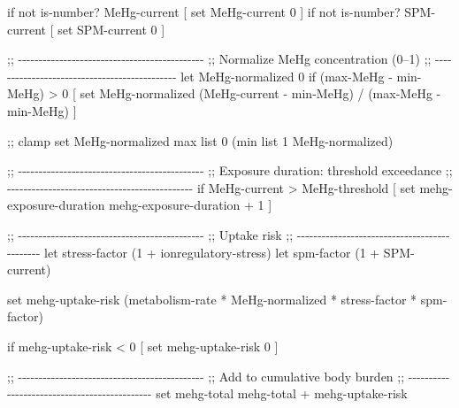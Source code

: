 \documentclass[
]{book}
\newenvironment{Shaded}{\begin{snugshade}}{\end{snugshade}}
\newcommand{\NormalTok}[1]{#1}
\begin{document}
\begin{Shaded}
\begin{Highlighting}[]
\NormalTok{  if not is{-}number? MeHg{-}current [ set MeHg{-}current 0 ]}
\NormalTok{  if not is{-}number? SPM{-}current  [ set SPM{-}current 0 ]}

\NormalTok{  ;; {-}{-}{-}{-}{-}{-}{-}{-}{-}{-}{-}{-}{-}{-}{-}{-}{-}{-}{-}{-}{-}{-}{-}{-}{-}{-}{-}{-}{-}{-}{-}{-}{-}{-}{-}{-}{-}{-}{-}{-}{-}{-}{-}{-}{-}}
\NormalTok{  ;; Normalize MeHg concentration (0–1)}
\NormalTok{  ;; {-}{-}{-}{-}{-}{-}{-}{-}{-}{-}{-}{-}{-}{-}{-}{-}{-}{-}{-}{-}{-}{-}{-}{-}{-}{-}{-}{-}{-}{-}{-}{-}{-}{-}{-}{-}{-}{-}{-}{-}{-}{-}{-}{-}{-}}
\NormalTok{  let MeHg{-}normalized 0}
\NormalTok{  if (max{-}MeHg {-} min{-}MeHg) \textgreater{} 0 [}
\NormalTok{    set MeHg{-}normalized (MeHg{-}current {-} min{-}MeHg) / (max{-}MeHg {-} min{-}MeHg)}
\NormalTok{  ]}
  
\NormalTok{  ;; clamp}
\NormalTok{  set MeHg{-}normalized max list 0 (min list 1 MeHg{-}normalized)}
  
\NormalTok{  ;; {-}{-}{-}{-}{-}{-}{-}{-}{-}{-}{-}{-}{-}{-}{-}{-}{-}{-}{-}{-}{-}{-}{-}{-}{-}{-}{-}{-}{-}{-}{-}{-}{-}{-}{-}{-}{-}{-}{-}{-}{-}{-}{-}{-}{-}}
\NormalTok{  ;; Exposure duration: threshold exceedance}
\NormalTok{  ;; {-}{-}{-}{-}{-}{-}{-}{-}{-}{-}{-}{-}{-}{-}{-}{-}{-}{-}{-}{-}{-}{-}{-}{-}{-}{-}{-}{-}{-}{-}{-}{-}{-}{-}{-}{-}{-}{-}{-}{-}{-}{-}{-}{-}{-}}
\NormalTok{  if MeHg{-}current \textgreater{} MeHg{-}threshold [}
\NormalTok{    set mehg{-}exposure{-}duration mehg{-}exposure{-}duration + 1}
\NormalTok{  ]}
  
\NormalTok{  ;; {-}{-}{-}{-}{-}{-}{-}{-}{-}{-}{-}{-}{-}{-}{-}{-}{-}{-}{-}{-}{-}{-}{-}{-}{-}{-}{-}{-}{-}{-}{-}{-}{-}{-}{-}{-}{-}{-}{-}{-}{-}{-}{-}{-}{-}}
\NormalTok{  ;; Uptake risk}
\NormalTok{  ;; {-}{-}{-}{-}{-}{-}{-}{-}{-}{-}{-}{-}{-}{-}{-}{-}{-}{-}{-}{-}{-}{-}{-}{-}{-}{-}{-}{-}{-}{-}{-}{-}{-}{-}{-}{-}{-}{-}{-}{-}{-}{-}{-}{-}{-}}
\NormalTok{  let stress{-}factor (1 + ionregulatory{-}stress)}
\NormalTok{  let spm{-}factor    (1 + SPM{-}current)}

\NormalTok{  set mehg{-}uptake{-}risk (metabolism{-}rate * MeHg{-}normalized * stress{-}factor * spm{-}factor)}

\NormalTok{  if mehg{-}uptake{-}risk \textless{} 0 [ set mehg{-}uptake{-}risk 0 ]}
  
\NormalTok{  ;; {-}{-}{-}{-}{-}{-}{-}{-}{-}{-}{-}{-}{-}{-}{-}{-}{-}{-}{-}{-}{-}{-}{-}{-}{-}{-}{-}{-}{-}{-}{-}{-}{-}{-}{-}{-}{-}{-}{-}{-}{-}{-}{-}{-}{-}}
\NormalTok{  ;; Add to cumulative body burden}
\NormalTok{  ;; {-}{-}{-}{-}{-}{-}{-}{-}{-}{-}{-}{-}{-}{-}{-}{-}{-}{-}{-}{-}{-}{-}{-}{-}{-}{-}{-}{-}{-}{-}{-}{-}{-}{-}{-}{-}{-}{-}{-}{-}{-}{-}{-}{-}{-}}
\NormalTok{  set mehg{-}total mehg{-}total + mehg{-}uptake{-}risk}
  

\end{Highlighting}
\end{Shaded}
\end{document}
